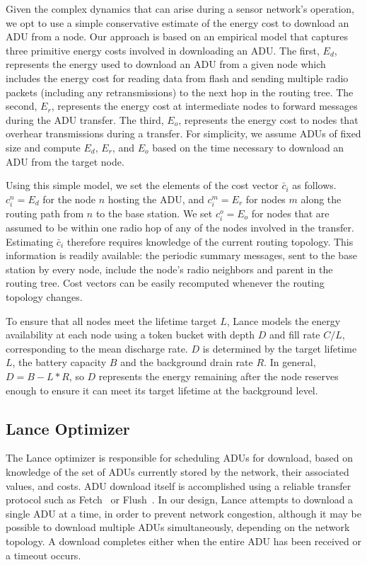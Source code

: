 Given the complex dynamics that can arise during a sensor network's
operation, we opt to use a simple conservative estimate of the energy cost to
download an ADU from a node. Our approach is based on an empirical model that
captures three primitive energy costs involved in downloading an ADU. The
first, $E_d$, represents the energy used to download an ADU from a given node
which includes the energy cost for reading data from flash and sending
multiple radio packets (including any retransmissions) to the next hop in the
routing tree. The second, $E_r$, represents the energy cost at intermediate
nodes to forward messages during the ADU transfer. The third, $E_o$,
represents the energy cost to nodes that overhear transmissions during a
transfer. For simplicity, we assume ADUs of fixed size and compute $E_d$,
$E_r$, and $E_o$ based on the time necessary to download an ADU from the
target node.

Using this simple model, we set the elements of the cost vector $\bar{c}_i$
as follows. $c_i^n = E_d$ for the node $n$ hosting the ADU, and $c_i^m = E_r$
for nodes $m$ along the routing path from $n$ to the base station. We set
$c_i^o = E_o$ for nodes that are assumed to be within one radio hop of any of
the nodes involved in the transfer. Estimating $\bar{c}_i$ therefore requires
knowledge of the current routing topology. This information is readily
available: the periodic summary messages, sent to the base station by every
node, include the node's radio neighbors and parent in the routing tree. Cost
vectors can be easily recomputed whenever the routing topology changes.

To ensure that all nodes meet the lifetime target $L$, Lance models the
energy availability at each node using a token bucket with depth $D$ and fill
rate $C/L$, corresponding to the mean discharge rate. $D$ is determined by
the target lifetime $L$, the battery capacity $B$ and the background drain
rate $R$. In general, $D = B - L*R$, so $D$ represents the energy remaining
after the node reserves enough to ensure it can meet its target lifetime at
the background level.

\subsection{Lance Optimizer}
\label{lance-sec-lanceoptimizer}

The Lance optimizer is responsible for scheduling ADUs for download, based on
knowledge of the set of ADUs currently stored by the network, their
associated values, and costs. ADU download itself is accomplished using a
reliable transfer protocol such as Fetch~\cite{volcano-osdi06} or
Flush~\cite{flush-sensys07}. In our design, Lance attempts to download a
single ADU at a time, in order to prevent network congestion, although it may
be possible to download multiple ADUs simultaneously, depending on the
network topology. A download completes either when the entire ADU has been
received or a timeout occurs.

